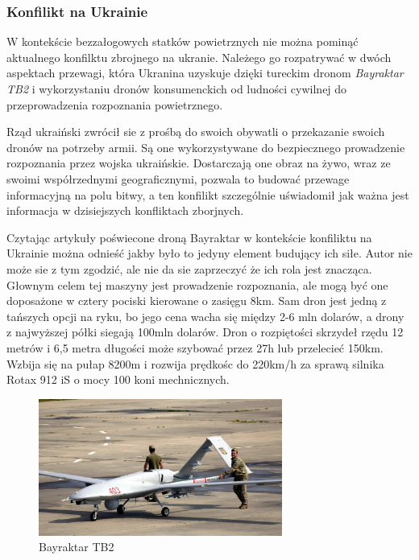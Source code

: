 \subsubsection{Konfilikt na Ukrainie}
\hspace{1cm}W kontekście bezzałogowych statków powietrznych nie można pominąć aktualnego konfilktu zbrojnego na ukranie. Należego go rozpatrywać w dwóch aspektach przewagi, która Ukranina uzyskuje dzięki tureckim dronom \textit{Bayraktar TB2} i wykorzystaniu dronów konsumenckich od ludności cywilnej do przeprowadzenia rozpoznania powietrznego. 

\hspace{1cm}Rząd ukraiński zwrócił sie z prośbą do swoich obywatli o przekazanie swoich dronów na potrzeby armii. Są one wykorzystywane do bezpiecznego prowadzenie rozpoznania przez wojska ukraińskie. Dostarczają one obraz na żywo, wraz ze swoimi współrzednymi geograficznymi, pozwala to budować przewage informacyjną na polu bitwy, a ten konfilikt szczególnie uświadomił jak ważna jest informacja w dzisiejszych konfliktach zborjnych.\cite{fotografia-drony-ukraina}

\hspace{1cm}Czytając artykuły poświecone droną Bayraktar w kontekście konfiliktu na Ukrainie można odnieść jakby było to jedyny element budujący ich siłe. Autor nie może sie z tym zgodzić, ale nie da sie zaprzeczyć że ich rola jest znacząca. Głownym celem tej maszyny jest prowadzenie rozpoznania, ale mogą być one doposażone w cztery pociski kierowane o zasięgu 8km. Sam dron jest jedną z tańszych opcji na ryku, bo jego cena wacha się między 2-6 mln dolarów, a drony z najwyższej półki siegają 100mln dolarów. Dron o rozpiętości skrzydeł rzędu 12 metrów i 6,5 metra długości może szybować przez 27h lub przelecieć 150km. Wzbija się na pułap 8200m i rozwija prędkośc do 220km/h za sprawą silnika Rotax 912 iS o mocy 100 koni mechnicznych. \cite{bayraktar-chip}\cite{bayraktar-pap}

\begin{figure}[!ht]
  \centering
  \includegraphics[width=8cm]{./Obrazy/Bayraktar_TB2_ukraina.jpg}
  \caption{Bayraktar TB2}
  \end{figure}


